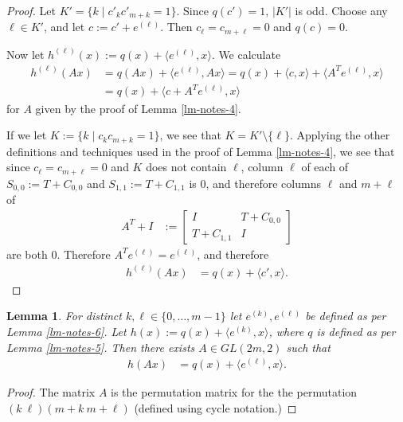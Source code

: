 \documentclass[12pt,a4paper]{article}
\newcommand{\abs}[1]{\left| #1 \right|}
\newtheorem{Lemma}{Lemma}
\begin{document}
\begin{proof}
Let $K'=\{k \mid c'_k c'_{m+k} = 1\}$. Since $q(c')=1$, $\abs{K'}$ is odd.
Choose any $\ell \in K'$, and let $c := c' + e^{(\ell)}$.
Then $c_{\ell} = c_{m+\ell} = 0$ and $q(c)=0$.

Now let $h^{(\ell)}(x) := q(x) + \langle e^{(\ell)}, x \rangle$.
We calculate
\begin{align*}
h^{(\ell)}(A x) 
&= 
q(A x) + \langle e^{(\ell)}, A x \rangle
=
q(x) + \langle c, x \rangle + \langle A^T e^{(\ell)}, x \rangle
\\
&=
q(x) + \langle c + A^T e^{(\ell)}, x \rangle
\end{align*}
for $A$ given by the proof of Lemma \ref{lm-notes-4}.
 
If we let $K := \{ k \mid c_k c_{m+k} = 1 \}$, we see that $K = K' \setminus \{\ell\}$.
Applying the other definitions and techniques used in the proof of Lemma \ref{lm-notes-4},
we see that since $c_{\ell} = c_{m+\ell} = 0$ and $K$ does not contain $\ell$, 
column $\ell$ of each of $S_{0,0} := T + C_{0,0}$
and $S_{1,1} := T + C_{1,1}$ is $0$, and therefore columns $\ell$ and $m + \ell$ of
\begin{align*}
A^T + I
&:=
\left[
\begin{array}{cc}
I & T + C_{0,0}
\\
T + C_{1,1} & I
\end{array}
\right]
\end{align*}
are both $0$.
Therefore $A^T e^{(\ell)} = e^{(\ell)}$, and therefore
\begin{align*}
h^{(\ell)}(A x) 
&= 
q(x) + \langle c', x \rangle.
\end{align*}

\end{proof}

\begin{Lemma}
\label{lm-notes-6-b}
For distinct $k,\ell \in \{0,\ldots,m-1\}$ let $e^{(k)}, e^{(\ell)}$ be defined as per Lemma \ref{lm-notes-6}.
Let $h(x) := q(x) + \langle e^{(k)}, x \rangle$, where $q$ is defined as per Lemma \ref{lm-notes-5}.
Then there exists $A \in GL(2 m, 2)$ such that
\begin{align}
h(A x)
&=
q(x) + \langle e^{(\ell)},x \rangle.
\end{align}
\end{Lemma}

\begin{proof}
The matrix $A$ is the permutation matrix for the the permutation $(k\ \ell)(m+k\ m+\ell)$ (defined using cycle notation.)
\end{proof}
\end{document}
